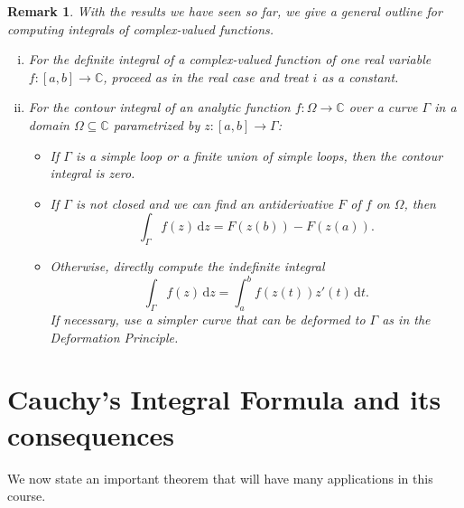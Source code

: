 \documentclass[10pt]{article}
\newcommand{\C}{\mathbb{C}}
\newcommand{\dd}{\,\mathrm{d}}
\theoremstyle{newstyle}
\newtheorem{remark}[thm]{Remark}
\begin{document}
\begin{remark}
With the results we have seen so far, we give a general outline for computing 
integrals of complex-valued functions. 
\begin{enumerate}[(i)]
    \item For the definite integral of a complex-valued function of one real variable $f : 
    [a, b] \to \C$, proceed as in the real case and treat $i$ as a constant. 
    \item For the contour integral of an analytic function $f : \Omega \to \C$ over a 
    curve $\Gamma$ in a domain $\Omega \subseteq \C$ parametrized by $z : [a,b] \to \Gamma$: 
    \begin{itemize}
        \item If $\Gamma$ is a simple loop or a finite union of simple loops, then 
        the contour integral is zero. 
        \item If $\Gamma$ is not closed and we can find an antiderivative $F$ of $f$ 
        on $\Omega$, then 
        \[ \int_\Gamma f(z)\dd z = F(z(b)) - F(z(a)). \]
        \item Otherwise, directly compute the indefinite integral 
        \[ \int_\Gamma f(z)\dd z = \int_a^b f(z(t)) z'(t)\dd t. \]
        If necessary, use a simpler curve that can be deformed to $\Gamma$ 
        as in the Deformation Principle. 
    \end{itemize}
\end{enumerate}
\end{remark}

\newpage 
\section{Cauchy's Integral Formula and its consequences}

We now state an important theorem that will have many applications in this course. 
\end{document}
